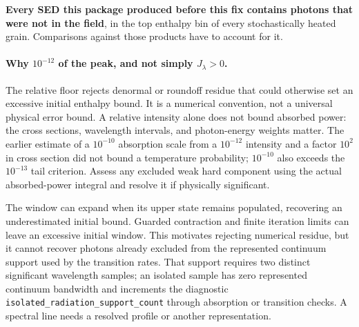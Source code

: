 \documentclass{my_memo}
\newcommand{\code}[1]{\texttt{#1}}
\begin{document}
\medskip
\noindent\textbf{Every SED this package produced before this fix contains
photons that were not in the field}, in the top enthalpy bin of every
stochastically heated grain. Comparisons against those products have to account
for it.

\paragraph{Why $10^{-12}$ of the peak, and not simply $J_\lambda>0$.}
The relative floor rejects denormal or roundoff residue that could otherwise
set an excessive initial enthalpy bound. It is a numerical convention, not
a universal physical error bound. A relative intensity alone does not bound
absorbed power: the cross sections, wavelength intervals, and photon-energy
weights matter. The earlier estimate of a $10^{-10}$ absorption scale from
a $10^{-12}$ intensity and a factor $10^2$ in cross section did not bound a
temperature probability; $10^{-10}$ also exceeds the $10^{-13}$ tail
criterion. Assess any excluded weak hard component using the actual
absorbed-power integral and resolve it if physically significant.

The window can expand when its upper state remains populated, recovering
an underestimated initial bound. Guarded contraction and finite iteration
limits can leave an excessive initial window. This motivates rejecting
numerical residue, but it cannot recover photons already excluded from the
represented continuum support used by the transition rates. That support
requires two distinct significant wavelength samples; an isolated sample
has zero represented continuum bandwidth and increments the diagnostic
\code{isolated\_radiation\_support\_count} through absorption or transition
checks. A spectral line needs a resolved profile or another representation.
\end{document}
